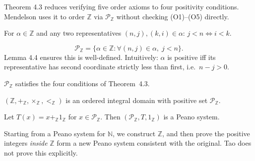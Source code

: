 \begin{remark}
Theorem 4.3 reduces verifying five order axioms to four positivity
conditions.  Mendelson uses it to order $\mathbb{Z}$ via
$\mathcal{P}_\mathbb{Z}$ without checking (O1)--(O5) directly.
\end{remark}

\begin{lemma}
\label{lem:men-positivity-class-invariant}
For $\alpha\in\mathbb{Z}$ and any two representatives
$(n,j),(k,i)\in\alpha$: $j<n \iff i<k$.
\end{lemma}

\begin{tcolorbox}[colback=corbox, colframe=corborder, arc=2pt,
  left=6pt, right=6pt, top=4pt, bottom=4pt,
  title={\small\textbf{Definition 4.5 (Positivity set $\mathcal{P}_\mathbb{Z}$)}},
  fonttitle=\small\bfseries]
\[
\mathcal{P}_{\mathbb{Z}}
= \bigl\{\alpha\in\mathbb{Z}
: \forall(n,j)\in\alpha,\; j<n \bigr\}.
\]
Lemma 4.4 ensures this is well-defined.
Intuitively: $\alpha$ is positive iff its representative has
second coordinate strictly less than first, i.e.\ $n-j > 0$.
\end{tcolorbox}

\begin{lemma}[Mendelson 4.5]
\label{lem:men-positive-set-conditions}
$\mathcal{P}_\mathbb{Z}$ satisfies the four conditions of Theorem~4.3.
\end{lemma}

\begin{corollary}[Mendelson 4.6]
\label{cor:men-integers-ordered-integral-domain}
$(\mathbb{Z},+_\mathbb{Z},\times_\mathbb{Z},<_\mathbb{Z})$ is an
ordered integral domain with positive set $\mathcal{P}_\mathbb{Z}$.
\end{corollary}

\begin{theorem}
\label{thm:men-positive-integers-form-peano-system}
Let $T(x)=x+_\mathbb{Z}1_\mathbb{Z}$ for $x\in\mathcal{P}_\mathbb{Z}$.
Then $(\mathcal{P}_\mathbb{Z},T,1_\mathbb{Z})$ is a Peano system.
\end{theorem}

\begin{remark}[Significance]
Starting from a Peano system for $\mathbb{N}$, we construct $\mathbb{Z}$,
and then prove the positive integers \emph{inside} $\mathbb{Z}$ form a
new Peano system consistent with the original.
Tao does not prove this explicitly.
\end{remark}

